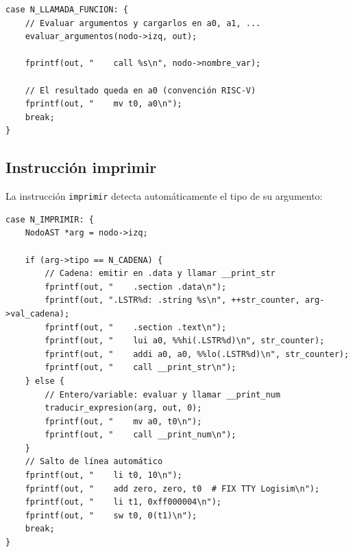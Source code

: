 \begin{lstlisting}[style=cstyle, caption={Generación de llamada a función}]
case N_LLAMADA_FUNCION: {
    // Evaluar argumentos y cargarlos en a0, a1, ...
    evaluar_argumentos(nodo->izq, out);
    
    fprintf(out, "    call %s\n", nodo->nombre_var);
    
    // El resultado queda en a0 (convención RISC-V)
    fprintf(out, "    mv t0, a0\n");
    break;
}
\end{lstlisting}

\subsection{Instrucción imprimir}

La instrucción \texttt{imprimir} detecta automáticamente el tipo de su argumento:

\begin{lstlisting}[style=cstyle, caption={Generación de imprimir}]
case N_IMPRIMIR: {
    NodoAST *arg = nodo->izq;
    
    if (arg->tipo == N_CADENA) {
        // Cadena: emitir en .data y llamar __print_str
        fprintf(out, "    .section .data\n");
        fprintf(out, ".LSTR%d: .string %s\n", ++str_counter, arg->val_cadena);
        fprintf(out, "    .section .text\n");
        fprintf(out, "    lui a0, %%hi(.LSTR%d)\n", str_counter);
        fprintf(out, "    addi a0, a0, %%lo(.LSTR%d)\n", str_counter);
        fprintf(out, "    call __print_str\n");
    } else {
        // Entero/variable: evaluar y llamar __print_num
        traducir_expresion(arg, out, 0);
        fprintf(out, "    mv a0, t0\n");
        fprintf(out, "    call __print_num\n");
    }
    // Salto de línea automático
    fprintf(out, "    li t0, 10\n");
    fprintf(out, "    add zero, zero, t0  # FIX TTY Logisim\n");
    fprintf(out, "    li t1, 0xff000004\n");
    fprintf(out, "    sw t0, 0(t1)\n");
    break;
}
\end{lstlisting}

